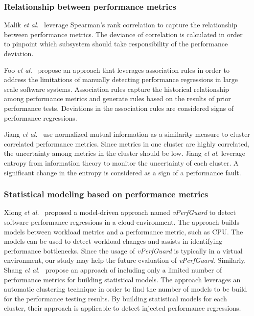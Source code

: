 \subsubsection{Relationship between performance metrics}
\label{sec:relatedrelation}

Malik \emph{et al$.$}~\cite{5635038} leverage Spearman's rank correlation to capture the relationship between performance metrics. The deviance of correlation is calculated in order to pinpoint which subsystem should take responsibility of the performance deviation.

Foo \emph{ et al$.$}~\cite{foo2010mining} propose an approach that leverages association rules in order to address the limitations of manually detecting performance regressions in large scale software systems. Association rules capture the historical relationship among performance metrics and generate rules based on the results of prior performance tests. Deviations in the association rules are considered signs of performance regressions.

Jiang \emph{et al$.$}~\cite{5270324} use normalized mutual information as a similarity measure to cluster correlated performance metrics. Since metrics in one cluster are highly correlated, the uncertainty among metrics in the cluster should be low. Jiang \emph{et al$.$} leverage entropy from information theory to monitor the uncertainty of each cluster. A significant change in the entropy is considered as a sign of a performance fault. 


\subsubsection{Statistical modeling based on performance metrics}
\label{sec:relatedmodel}

Xiong \textit{et al$.$}~\cite{xiong2013vperfguard} proposed a model-driven approach named \textit{vPerfGuard} to detect software performance regressions in a cloud-environment. The approach builds models between workload metrics and a performance metric, such as CPU. The models can be used to detect workload changes and assists in identifying performance bottlenecks. Since the usage of \emph{vPerfGuard} is typically in a virtual environment, our study may help the future evaluation of \textit{vPerfGuard}. Similarly, Shang \textit{ et al.}~\cite{Shang:2015:ADP:2668930.2688052} propose an approach of including only a limited number of performance metrics for building statistical models. The approach leverages an automatic clustering technique in order to find the number of models to be build for the performance testing results. By building statistical models for each cluster, their approach is applicable to detect injected performance regressions. 

